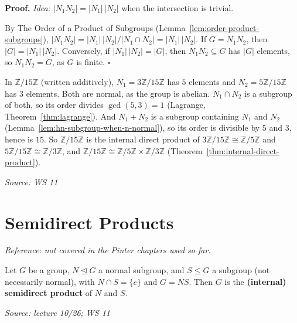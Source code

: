 \documentclass[11pt]{report}
\renewenvironment{proof}[1][Proof]{\noindent\textbf{#1.} }{\hfill$\square$\par\vspace{5pt}}
\newcommand{\srcline}[1]{\par\hfill{\footnotesize\textit{Source: #1}}}
\begin{document}
\begin{proof}
\textit{Idea:} $|N_1N_2| = |N_1|\,|N_2|$ when the intersection is trivial.\par
By The Order of a Product of Subgroups (Lemma~\ref{lem:order-product-subgroups}), $|N_1N_2| = |N_1|\,|N_2|/|N_1 \cap N_2| = |N_1|\,|N_2|$. If $G = N_1N_2$, then $|G| = |N_1|\,|N_2|$. Conversely, if $|N_1|\,|N_2| = |G|$, then $N_1N_2 \subseteq G$ has $|G|$ elements, so $N_1N_2 = G$, as $G$ is finite.
\end{proof}

\begin{exbox}\label{ex:z15-internal-direct-product}
In $\mathbb{Z}/15\mathbb{Z}$ (written additively), $N_1 = 3\mathbb{Z}/15\mathbb{Z}$ has $5$ elements and $N_2 = 5\mathbb{Z}/15\mathbb{Z}$ has $3$ elements. Both are normal, as the group is abelian. $N_1 \cap N_2$ is a subgroup of both, so its order divides $\gcd(5, 3) = 1$ (Lagrange, Theorem~\ref{thm:lagrange}). And $N_1 + N_2$ is a subgroup containing $N_1$ and $N_2$ (Lemma~\ref{lem:hn-subgroup-when-n-normal}), so its order is divisible by $5$ and $3$, hence is $15$. So $\mathbb{Z}/15\mathbb{Z}$ is the internal direct product of $3\mathbb{Z}/15\mathbb{Z} \cong \mathbb{Z}/5\mathbb{Z}$ and $5\mathbb{Z}/15\mathbb{Z} \cong \mathbb{Z}/3\mathbb{Z}$, and $\mathbb{Z}/15\mathbb{Z} \cong \mathbb{Z}/5\mathbb{Z} \times \mathbb{Z}/3\mathbb{Z}$ (Theorem~\ref{thm:internal-direct-product}).
\srcline{WS 11}
\end{exbox}

\section{Semidirect Products}\label{sec:semidirect-products}

\textit{Reference: not covered in the Pinter chapters used so far.}

\begin{defbox}\label{def:internal-semidirect-product}
Let $G$ be a group, $N \trianglelefteq G$ a normal subgroup, and $S \leq G$ a subgroup (not necessarily normal), with $N \cap S = \{e\}$ and $G = NS$. Then $G$ is the \textbf{(internal) semidirect product} of $N$ and $S$.
\srcline{lecture 10/26; WS 11}
\end{defbox}
\end{document}
